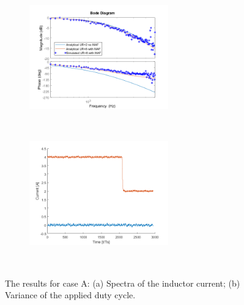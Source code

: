\documentclass[journal]{IEEEtran}
\begin{document}
\begin{figure}[t!]
\centering
\begin{subfigure}{0.5\textwidth}
  \centering
  \includegraphics[width=0.95\linewidth, height = 45mm]{figures/nas_clfra.png}
  \caption{}
  \label{fig:N4100kHz_sub1}
\end{subfigure}\\
\begin{subfigure}{0.5\textwidth}
  \centering
  \includegraphics[width=0.95\linewidth, height = 45mm]{figures/nas_step.png}
  \caption{}
  \label{fig:N4100kHz_sub2}
\end{subfigure}\\
\caption{The results for case A: (a) Spectra of the inductor current; (b) Variance of the applied duty cycle.}
\label{fig:N4100kHz}
\end{figure}
\end{document}
